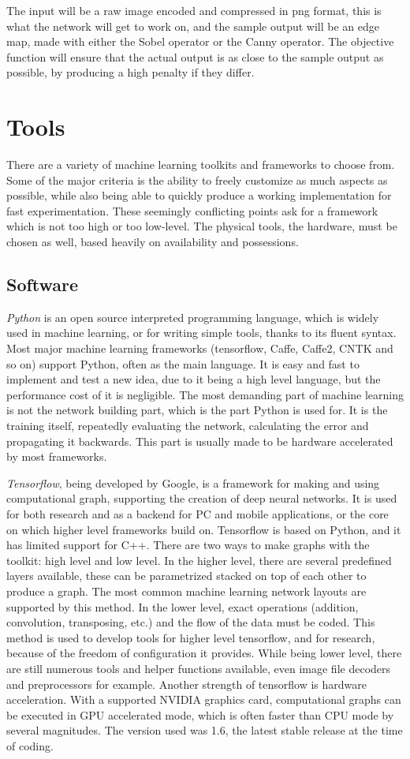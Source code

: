 \documentclass[12pt]{report}
\begin{document}
The input will be a raw image encoded and compressed in png format, this is what the network will get to work on, and the sample output will be an edge map, made with either the Sobel operator or the Canny operator. The objective function will ensure that the actual output is as close to the sample output as possible, by producing a high penalty if they differ.
\section{Tools}
There are a variety of machine learning toolkits and frameworks to choose from. Some of the major criteria is the ability to freely customize as much aspects as possible, while also being able to quickly produce a working implementation for fast experimentation. These seemingly conflicting points ask for a framework which is not too high or too low-level. The physical tools, the hardware, must be chosen as well, based heavily on availability and possessions.
\subsection{Software}
\textit{Python} is an open source interpreted programming language, which is widely used in machine learning, or for writing simple tools, thanks to its fluent syntax. Most major machine learning frameworks (tensorflow, Caffe, Caffe2, CNTK and so on) support Python, often as the main language. It is easy and fast to implement and test a new idea, due to it being a high level language, but the performance cost of it is negligible. The most demanding part of machine learning is not the network building part, which is the part Python is used for. It is the training itself, repeatedly evaluating the network, calculating the error and propagating it backwards. This part is usually made to be hardware accelerated by most frameworks.

\textit{Tensorflow}, being developed by Google, is a framework for making and using computational graph, supporting the creation of deep neural networks. It is used for both research and as a backend for PC and mobile applications, or the core on which higher level frameworks build on. Tensorflow is based on Python, and it has limited support for C++. There are two ways to make graphs with the toolkit: high level and low level. In the higher level, there are several predefined layers available, these can be parametrized stacked on top of each other to produce a graph. The most common machine learning network layouts are supported by this method. In the lower level, exact operations (addition, convolution, transposing, etc.) and the flow of the data must be coded. This method is used to develop tools for higher level tensorflow, and for research, because of the freedom of configuration it provides. While being lower level, there are still numerous tools and helper functions available, even image file decoders and preprocessors for example. Another strength of tensorflow is hardware acceleration. With a supported NVIDIA graphics card, computational graphs can be executed in GPU accelerated mode, which is often faster than CPU mode by several magnitudes. The version used was 1.6, the latest stable release at the time of coding.
\end{document}
